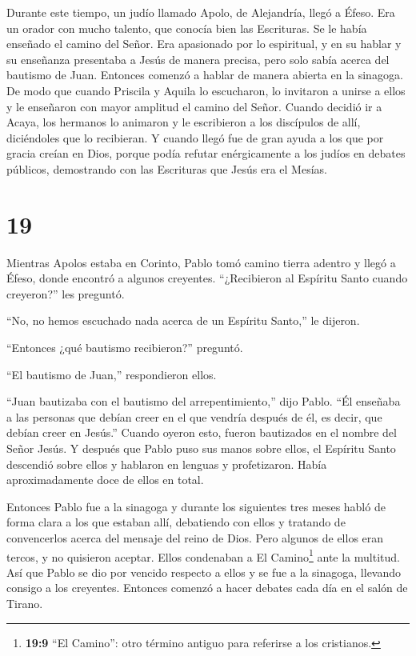  Durante este tiempo, un judío llamado Apolo, de
Alejandría, llegó a Éfeso. Era un orador con mucho talento, que conocía
bien las Escrituras.  Se le había enseñado el camino del
Señor. Era apasionado por lo espiritual, y en su hablar y su enseñanza
presentaba a Jesús de manera precisa, pero solo sabía acerca del
bautismo de Juan.  Entonces comenzó a hablar de manera
abierta en la sinagoga. De modo que cuando Priscila y Aquila lo
escucharon, lo invitaron a unirse a ellos y le enseñaron con mayor
amplitud el camino del Señor.  Cuando decidió ir a Acaya,
los hermanos lo animaron y le escribieron a los discípulos de allí,
diciéndoles que lo recibieran. Y cuando llegó fue de gran ayuda a los
que por gracia creían en Dios,  porque podía refutar
enérgicamente a los judíos en debates públicos, demostrando con las
Escrituras que Jesús era el Mesías.

\hypertarget{section-18}{%
\section{19}\label{section-18}}

 Mientras Apolos estaba en Corinto, Pablo tomó camino tierra
adentro y llegó a Éfeso, donde encontró a algunos creyentes.
 ``¿Recibieron al Espíritu Santo cuando creyeron?'' les
preguntó.

``No, no hemos escuchado nada acerca de un Espíritu Santo,'' le dijeron.

 ``Entonces ¿qué bautismo recibieron?'' preguntó.

``El bautismo de Juan,'' respondieron ellos.

 ``Juan bautizaba con el bautismo del arrepentimiento,''
dijo Pablo. ``Él enseñaba a las personas que debían creer en el que
vendría después de él, es decir, que debían creer en Jesús.''
 Cuando oyeron esto, fueron bautizados en el nombre del
Señor Jesús.  Y después que Pablo puso sus manos sobre
ellos, el Espíritu Santo descendió sobre ellos y hablaron en lenguas y
profetizaron.  Había aproximadamente doce de ellos en total.

 Entonces Pablo fue a la sinagoga y durante los siguientes
tres meses habló de forma clara a los que estaban allí, debatiendo con
ellos y tratando de convencerlos acerca del mensaje del reino de Dios.
 Pero algunos de ellos eran tercos, y no quisieron aceptar.
Ellos condenaban a El Camino\footnote{\textbf{19:9} ``El Camino'': otro
  término antiguo para referirse a los cristianos.} ante la multitud.
Así que Pablo se dio por vencido respecto a ellos y se fue a la
sinagoga, llevando consigo a los creyentes. Entonces comenzó a hacer
debates cada día en el salón de Tirano.

